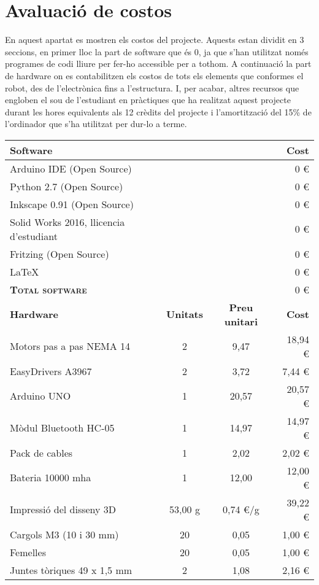 \section{Avaluació de costos}
En aquest apartat es mostren els costos del projecte. Aquests estan dividit en 3 seccions, en primer lloc la part de software que és 0, ja que s'han utilitzat només programes de codi lliure per fer-ho accessible per a tothom. A continuació la part de hardware on es contabilitzen els costos de tots els elements que conformes el robot, des de l'electrònica fins a l'estructura. I, per acabar, altres recursos que engloben el sou de l'estudiant en pràctiques que ha realitzat aquest projecte durant les hores equivalents als 12 crèdits del projecte i l'amortització del 15\% de l'ordinador que s'ha utilitzat per dur-lo a terme. 
\begin{longtable}{@{\extracolsep{\fill}} lccr}
	\toprule
	\textbf{Software}    & &  & \textbf{Cost} \\
	\midrule
	Arduino IDE (Open Source) & & &  0 \euro \\
	Python 2.7 (Open Source)& & & 0 \euro \\
	Inkscape 0.91 (Open Source)& & & 0 \euro \\
	Solid Works 2016, llicencia d'estudiant & & & 0 \euro \\
	Fritzing (Open Source) & & & 0 \euro \\
	\LaTeX & & & 0 \euro \\	
	\midrule
	\textsc{\textbf{Total software}}  & & & 0 \euro\\
	\toprule
	\textbf{Hardware} & \textbf{Unitats} & \textbf{Preu unitari} & \textbf{Cost} \\
	\midrule
	Motors pas a pas NEMA 14 & 2 & 9,47 & 18,94 \euro \\
	EasyDrivers A3967 & 2 & 3,72 & 7,44 \euro \\
	Arduino UNO & 1 & 20,57 & 20,57 \euro \\
	Mòdul Bluetooth HC-05 & 1 & 14,97 &  14,97 \euro \\
	Pack de cables & 1 & 2,02 & 2,02 \euro \\
	Bateria 10000 mha & 1 & 12,00 & 12,00 \euro \\
	Impressió del disseny 3D & 53,00 g & 0,74 \euro/g & 39,22 \euro \\
	Cargols M3 (10 i 30 mm) & 20 & 0,05 & 1,00 \euro \\
	Femelles  & 20 & 0,05 & 1,00 \euro \\
	Juntes tòriques 49 x 1,5 mm & 2 & 1,08 & 2,16 \euro \\ 	

\end{longtable}

